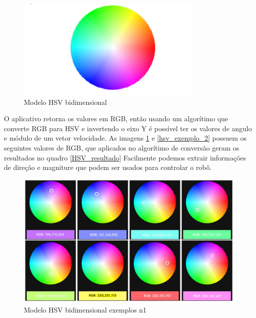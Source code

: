 \begin{figure}[htb]
	\centering
	\includegraphics[width=0.8\textwidth]{figures/HSV}
	\caption{Modelo HSV bidimensional \cite{hsv_model}}
\end{figure}


O aplicativo retorna os valores em RGB, então usando um algorítimo que converte RGB para HSV e invertendo o eixo Y
é possível ter os valores de angulo e módulo de um vetor velocidade.
As imagens \ref{hsv_exemplo_1} e \ref{hsv_exemplo_2} possuem os seguintes valores de RGB, que aplicados no algorítimo de conversão geram os resultados no quadro \ref{HSV_resultado}
Facilmente podemos extrair informações de direção e magniture que podem ser usados para controlar o robô.

\begin{figure}[htb]
	\centering
	\includegraphics[width=1.0\textwidth]{figures/example_1_arduino_color}
	\caption{Modelo HSV bidimensional exemplos n1}
	\label{hsv_exemplo_1}
\end{figure}

